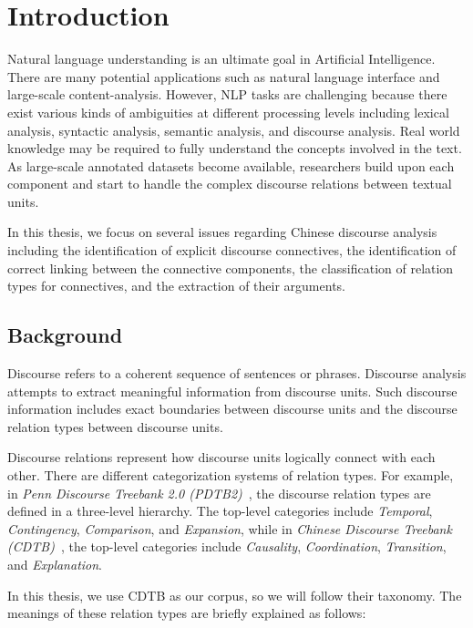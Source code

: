 %
%
%
\chapter{Introduction}
\label{c:intro}

Natural language understanding is an ultimate goal in Artificial
Intelligence. There are many potential applications such as natural language
interface and large-scale content-analysis. However, NLP tasks are
challenging because there exist various kinds of ambiguities at different processing levels
including lexical analysis, syntactic analysis, semantic analysis, and discourse analysis.
Real world knowledge may be required to fully understand the concepts involved in the text.
As large-scale annotated datasets become available, researchers build upon each
component and start to handle the complex discourse relations between textual units.

In this thesis, we focus on several issues regarding Chinese discourse analysis
including the identification of explicit discourse connectives,
the identification of correct linking between the connective components,
the classification of relation types for connectives,
and the extraction of their arguments.

%
%
\section{Background}

Discourse refers to a coherent sequence of sentences or phrases.
Discourse analysis attempts to extract meaningful information from
discourse units. Such discourse information includes exact boundaries
between discourse units and the discourse relation types between
discourse units.

Discourse relations represent how discourse units logically connect
with each other. There are different categorization systems of relation types.
For example, in
\textit{Penn Discourse Treebank 2.0 (PDTB2)}~\citep{Prasad08thepenn}, the discourse
relation types are defined in a three-level hierarchy. The top-level categories
include \textit{Temporal}, \textit{Contingency}, \textit{Comparison},
and \textit{Expansion}, while in
\textit{Chinese Discourse Treebank (CDTB)}~\citep{li2014building},
the top-level categories include \textit{Causality}, \textit{Coordination},
\textit{Transition}, and \textit{Explanation}.

In this thesis, we use CDTB as our corpus, so we will follow their taxonomy.
The meanings of these relation types are briefly explained as follows:

